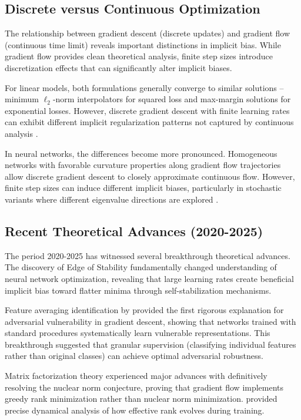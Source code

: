 \documentclass[11pt]{article}
\begin{document}
\subsection{Discrete versus Continuous Optimization}

The relationship between gradient descent (discrete updates) and gradient flow (continuous time limit) reveals important distinctions in implicit bias. While gradient flow provides clean theoretical analysis, finite step sizes introduce discretization effects that can significantly alter implicit biases.

For linear models, both formulations generally converge to similar solutions -- minimum $\ell_2$-norm interpolators for squared loss and max-margin solutions for exponential losses. However, discrete gradient descent with finite learning rates can exhibit different implicit regularization patterns not captured by continuous analysis \citep{pesme2021continuous}.

In neural networks, the differences become more pronounced. Homogeneous networks with favorable curvature properties along gradient flow trajectories allow discrete gradient descent to closely approximate continuous flow. However, finite step sizes can induce different implicit biases, particularly in stochastic variants where different eigenvalue directions are explored \citep{mulayoff2021continuous}.

\subsection{Recent Theoretical Advances (2020-2025)}

The period 2020-2025 has witnessed several breakthrough theoretical advances. The discovery of Edge of Stability fundamentally changed understanding of neural network optimization, revealing that large learning rates create beneficial implicit bias toward flatter minima through self-stabilization mechanisms.

Feature averaging identification by \citet{li2024feature} provided the first rigorous explanation for adversarial vulnerability in gradient descent, showing that networks trained with standard procedures systematically learn vulnerable representations. This breakthrough suggested that granular supervision (classifying individual features rather than original classes) can achieve optimal adversarial robustness.

Matrix factorization theory experienced major advances with \citet{li2020towards} definitively resolving the nuclear norm conjecture, proving that gradient flow implements greedy rank minimization rather than nuclear norm minimization. \citet{chou2024gradient} provided precise dynamical analysis of how effective rank evolves during training.
\end{document}
